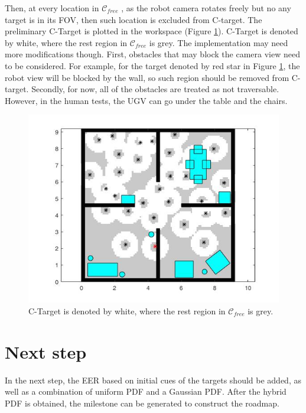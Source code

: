\documentclass[12pt,draftcls,onecolumn]{IEEEtran}
\begin{document}
Then, at every location in $\mathcal{C}_{free}$ , as the robot camera rotates freely but no any target is in its FOV, then such location is excluded from C-target.
The preliminary C-Target is plotted in the workspace (Figure \ref{fig:5}).
C-Target is denoted by white, where the rest region in $\mathcal{C}_{free}$ is grey. 
The implementation may need more modifications though.
First, obstacles that may block the camera view need to be considered. 
For example, for the target denoted by red star in Figure \ref{fig:5}, the robot view will be blocked by the wall, so such region should be removed from C-target.
Secondly, for now, all of the obstacles are treated as not traversable. 
However, in the human tests, the UGV can go under the table and the chairs. 







\begin{figure}
 \centering
  \includegraphics[width=18cm]{figures/fovRot}
  \caption{C-Target is denoted by white, where the rest region in $\mathcal{C}_{free}$ is grey.}
  \label{fig:5}
\end{figure}





\section{Next step} 
In the next step, the EER based on initial cues of the targets should be added, as well as a combination of uniform PDF and a Gaussian PDF.
After the hybrid PDF is obtained, the milestone can be generated to construct the roadmap.
\end{document}
